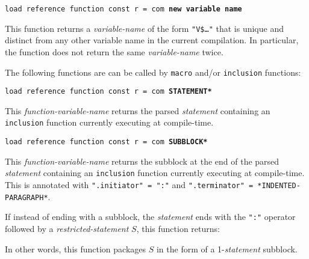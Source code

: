 \documentclass[12pt]{article}
\newcommand{\ttkey}[1]{{\tt \bfseries #1}}
\newenvironment{indpar}[1][0.3in]%
	{\begin{list}{}%
		     {\setlength{\itemsep}{0in}%
		      \setlength{\topsep}{0in}%
		      \setlength{\parsep}{1ex}%
		      \setlength{\labelwidth}{#1}%
		      \setlength{\leftmargin}{#1}%
		      \addtolength{\leftmargin}{\labelsep}}%
	 \item}%
	{\end{list}}
\begin{document}
{\tt load reference function const r = com \ttkey{new variable name} }%
\label{NEW-VARIABLE-NAME}
\begin{indpar}
This function returns a {\em variable-name} of the form {\tt "V\$\ldots"}
that is unique and distinct from any other variable name in the current
compilation.  In particular, the function does not return the same
{\em variable-name} twice.
\end{indpar}

The following functions are can be called by {\tt macro} and/or
{\tt inclusion} functions:

{\tt load reference function const r = com \ttkey{*STATEMENT*} }%
\label{COM-STATEMENT}
\begin{indpar}
This {\em function-variable-name} returns the parsed {\em statement}
containing an {\tt inclusion} function
currently executing at compile-time.
\end{indpar}

{\tt load reference function const r = com \ttkey{*SUBBLOCK*} }%
\label{COM-SUBBLOCK}
\begin{indpar}
This {\em function-variable-name} returns the subblock at the end
of the parsed {\em statement}
containing an {\tt inclusion} function currently executing at compile-time.
This is annotated with {\tt ".initiator" = ":"} and
{\tt ".terminator" = *INDENTED-PARAGRAPH*}.

If instead of ending with a subblock, the {\em statement} ends with the
{\tt ":"} operator followed by a {\em restricted-statement} $S$,
this function returns: \\

In other words, this function packages $S$ in the form of a 1-{\em statement}
subblock.
\end{indpar}
\end{document}
